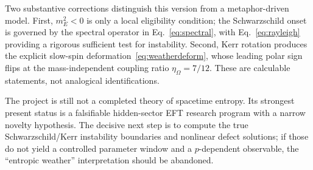\documentclass[11pt]{article}
\begin{document}
Two substantive corrections distinguish this version from a metaphor-driven model.  First, $m_E^2<0$ is only a local eligibility condition; the Schwarzschild onset is governed by the spectral operator in Eq.~\eqref{eq:spectral}, with Eq.~\eqref{eq:rayleigh} providing a rigorous sufficient test for instability.  Second, Kerr rotation produces the explicit slow-spin deformation~\eqref{eq:weatherdeform}, whose leading polar sign flips at the mass-independent coupling ratio $\eta_\Omega=7/12$.  These are calculable statements, not analogical identifications.

The project is still not a completed theory of spacetime entropy.  Its strongest present status is a falsifiable hidden-sector EFT research program with a narrow novelty hypothesis.  The decisive next step is to compute the true Schwarzschild/Kerr instability boundaries and nonlinear defect solutions; if those do not yield a controlled parameter window and a $p$-dependent observable, the ``entropic weather'' interpretation should be abandoned.

\printbibliography
\end{document}
